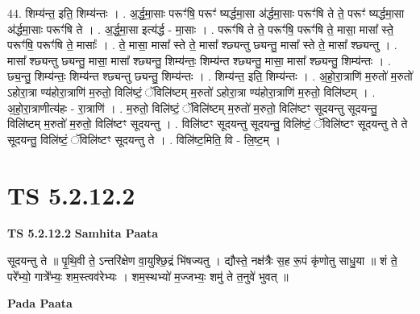 \documentclass[17pt]{extarticle}
\begin{document}
44. शिम्य॑न्त॒ इति॒ शिम्य॑न्तः । . अ॒र्द्ध॒मा॒साः परूꣳ॑षि॒ परूꣳ॑ ष्यर्द्धमा॒सा अ॑र्द्धमा॒साः परूꣳ॑षि ते ते॒ परूꣳ॑ ष्यर्द्धमा॒सा अ॑र्द्धमा॒साः परूꣳ॑षि ते । . अ॒र्द्ध॒मा॒सा इत्य॑र्द्ध - मा॒साः । . परूꣳ॑षि ते ते॒ परूꣳ॑षि॒ परूꣳ॑षि ते॒ मासा॒ मासा᳚ स्ते॒ परूꣳ॑षि॒ परूꣳ॑षि ते॒ मासाः᳚ । . ते॒ मासा॒ मासा᳚ स्ते ते॒ मासा᳚ श्छ्यन्तु छ्यन्तु॒ मासा᳚ स्ते ते॒ मासा᳚ श्छ्यन्तु । . मासा᳚ श्छ्यन्तु छ्यन्तु॒ मासा॒ मासा᳚ श्छ्यन्तु॒ शिम्य॑न्तः॒ शिम्य॑न्त श्छ्यन्तु॒ मासा॒ मासा᳚ श्छ्यन्तु॒ शिम्य॑न्तः । . छ्य॒न्तु॒ शिम्य॑न्तः॒ शिम्य॑न्त श्छ्यन्तु छ्यन्तु॒ शिम्य॑न्तः । . शिम्य॑न्त॒ इति॒ शिम्य॑न्तः । . अ॒हो॒रा॒त्राणि॑ म॒रुतो॑ म॒रुतो॑ ऽहोरा॒त्रा ण्य॑होरा॒त्राणि॑ म॒रुतो॒ विलि॑ष्टं॒ ॅविलि॑ष्टम् म॒रुतो॑ ऽहोरा॒त्रा ण्य॑होरा॒त्राणि॑ म॒रुतो॒ विलि॑ष्टम् । . अ॒हो॒रा॒त्राणीत्य॑हः - रा॒त्राणि॑ । . म॒रुतो॒ विलि॑ष्टं॒ ॅविलि॑ष्टम् म॒रुतो॑ म॒रुतो॒ विलि॑ष्टꣳ सूदयन्तु सूदयन्तु॒ विलि॑ष्टम् म॒रुतो॑ म॒रुतो॒ विलि॑ष्टꣳ सूदयन्तु । . विलि॑ष्टꣳ सूदयन्तु सूदयन्तु॒ विलि॑ष्टं॒ ॅविलि॑ष्टꣳ सूदयन्तु ते ते सूदयन्तु॒ विलि॑ष्टं॒ ॅविलि॑ष्टꣳ सूदयन्तु ते । . विलि॑ष्ट॒मिति॒ वि - लि॒ष्ट॒म् । \newline
\pagebreak
{}

\section{ TS 5.2.12.2 }

\textbf{TS 5.2.12.2 } \newline
\textbf{Samhita Paata} \newline

सूदयन्तु ते ॥ पृ॒थि॒वी ते॒ ऽन्तरि॑क्षेण वा॒युश्छि॒द्रं भि॑षज्यतु । द्यौस्ते॒ नक्ष॑त्रैः स॒ह रू॒पं कृ॑णोतु साधु॒या ॥ शं ते॒ परे᳚भ्यो॒ गात्रे᳚भ्यः॒ शम॒स्त्वव॑रेभ्यः । शम॒स्थभ्यो॑ म॒ज्जभ्यः॒ शमु॑ ते त॒नुवे॑ भुवत् ॥ \newline

\textbf{Pada Paata} \newline
\end{document}
